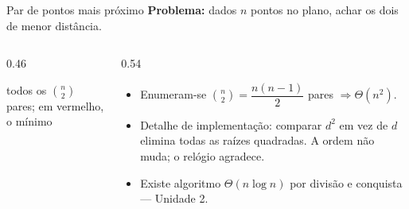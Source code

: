 \documentclass[aspectratio=169]{beamer}
\begin{document}
\begin{frame}{Par de pontos mais próximo}
  \textbf{Problema:} dados $n$ pontos no plano, achar os dois de menor distância.

  \begin{columns}[T]
    \begin{column}{0.46\textwidth}
      \begin{center}
      \end{center}
      \begin{center}\scriptsize todos os $\binom{n}{2}$ pares; em vermelho, o mínimo\end{center}
    \end{column}
    \begin{column}{0.54\textwidth}
      \begin{itemize}
        \item Enumeram-se $\binom{n}{2} = \dfrac{n(n-1)}{2}$ pares $\Rightarrow \Theta(n^2)$.
        \item Detalhe de implementação: comparar $d^2$ em vez de $d$ elimina
          todas as raízes quadradas. A ordem não muda; o relógio agradece.
        \item Existe algoritmo $\Theta(n \log n)$ por divisão e conquista ---
          Unidade 2.
      \end{itemize}
    \end{column}
  \end{columns}
\end{frame}
\end{document}
